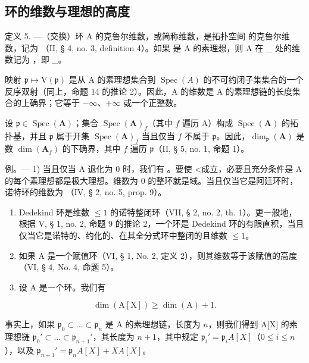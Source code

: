 \subsection{环的维数与理想的高度}

定义 5. —（交换）环 A 的克鲁尔维数，或简称维数，是拓扑空间  的克鲁尔维数，记为  （II, § 4, no. 3, definition 4）。如果  是 A 的素理想，则 A 在 \_ 处的维数记为 ，即 \_。

映射 \(\mathfrak{p} \mapsto \mathrm{V}(\mathfrak{p})\) 是从 A 的素理想集合到 \(\operatorname{Spec}(A)\) 的不可约闭子集集合的一个反序双射（同上，命题 14 的推论 2）。因此，A 的维数是 A 的素理想链的长度集合的上确界；它等于 \(-\infty\)、\(+\infty\) 或一个正整数。

设 \(\mathfrak{p} \in \operatorname{Spec}(\mathbf{A})\)；集合 \(\operatorname{Spec}(\mathbf{A})_f\)（其中 \(f\) 遍历 A）构成 \(\operatorname{Spec}(\mathbf{A})\) 的拓扑基，并且 \(\mathfrak{p}\) 属于开集 \(\operatorname{Spec}(\mathbf{A})_f\) 当且仅当 \(f\) 不属于 \(\mathfrak{p}\)。因此，\(\dim_{\mathfrak{p}}(\mathbf{A})\) 是数 \(\dim(\mathbf{A}_f)\) 的下确界，其中 \(f\) 遍历 \(\mathfrak{p}\)（II, § 5, no. 1, 命题 1）。

例。--- 1) 当且仅当 A 退化为 0 时，我们有  。要使 \textless 成立，必要且充分条件是 A 的每个素理想都是极大理想。维数为 0 的整环就是域。当且仅当它是阿廷环时，诺特环的维数为 {}（IV, § 2, no. 5, prop. 9）。

\begin{enumerate}
\def\labelenumi{\arabic{enumi})}
\setcounter{enumi}{1}
\item
Dedekind 环是维数 \(\leqslant 1\) 的诺特整闭环（VII, § 2, no. 2, th. 1）。更一般地，根据 V, § 1, no. 2, 命题 9 的推论 2，一个环是 Dedekind 环的有限直积，当且仅当它是诺特的、约化的、在其全分式环中整闭的且维数 \(\leqslant 1\)。
\item
如果 A 是一个赋值环（VI, § 1, No. 2, 定义 2），则其维数等于该赋值的高度（VI, § 4, No. 4, 命题 5）。
\item
设 A 是一个环。我们有
\end{enumerate}

\[
\dim (\mathrm{A} [ \mathrm{X} ]) \geqslant \dim (\mathrm{A}) + 1.
\]

事实上，如果 \(\mathfrak{p}_0 \subset \ldots \subset \mathfrak{p}_n\) 是 A 的素理想链，长度为 \(n\)，则我们得到 A[X] 的素理想链 \(\mathfrak{p}_0' \subset \ldots \subset \mathfrak{p}_{n+1}'\){}{}，其长度为 \(n+1\)，其中规定 \(\mathfrak{p}_i' = \mathfrak{p}_iA[X]\)（\(0 \leqslant i \leqslant n\)），以及 \(\mathfrak{p}_{n+1}' = \mathfrak{p}_nA[X] + XA[X]\)。

